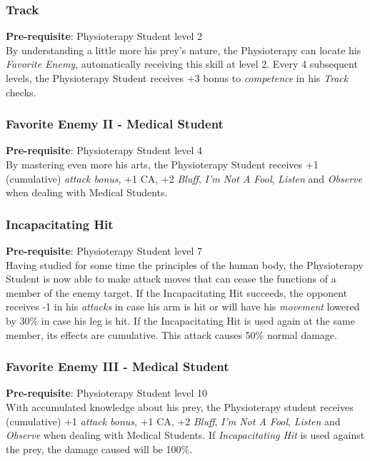 \documentclass[ letterpaper,12pt]{article}
\begin{document}
\subsubsection{Track}
 {\bf Pre-requisite}: Physioterapy Student level 2\\
 By understanding a little more his prey's nature, the Physioterapy can locate his {\it Favorite Enemy}, automatically receiving this skill at level 2. Every 4 subsequent levels, the Physioterapy Student receives +3 bonus to {\it competence} in his {\it Track} checks.

\subsubsection{Favorite Enemy II - Medical Student}
 {\bf Pre-requisite}: Physioterapy Student level 4\\
 By mastering even more his arts, the Physioterapy Student receives +1 (cumulative) {\it attack bonus}, +1 CA, +2 {\it Bluff}, {\it I'm Not A Fool}, {\it Listen} and {\it Observe} when dealing with Medical Students.

\subsubsection{Incapacitating Hit}
 {\bf Pre-requisite}: Physioterapy Student level 7\\
 Having studied for some time the principles of the human body, the Physioterapy Student is now able to make attack moves that can cease the functions of a member of the enemy target. If the Incapacitating Hit succeeds, the opponent receives -1 in his {\it attacks}  in case his arm is hit or will have his {\it movement} lowered by 30\% in case his leg is hit. If the Incapacitating Hit is used again at the same member, its effects are cumulative. This attack causes 50\% normal damage.

\subsubsection{Favorite Enemy III - Medical Student}
 {\bf Pre-requisite}: Physioterapy Student level 10\\
 With accumulated knowledge about his prey, the Physioterapy student receives (cumulative) +1 {\it attack bonus}, +1 CA, +2 {\it Bluff}, {\it I'm Not A Fool}, {\it Listen} and {\it Observe} when dealing with Medical Students. If {\it Incapacitating Hit} is used against the prey, the damage caused will be 100\%.
\end{document}
